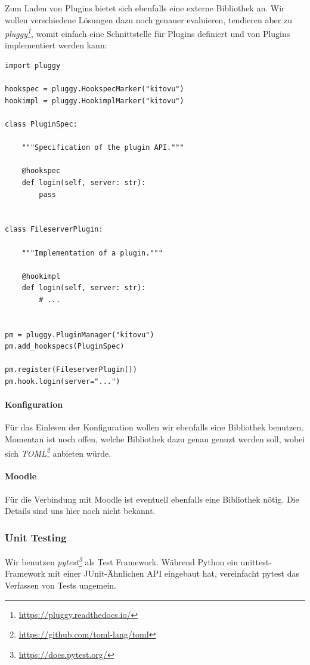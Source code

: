 \documentclass[a4paper]{article}
\newcommand{\tool}[2]{\emph{#1\footnote{\url{#2}}}}
\begin{document}
Zum Laden von Plugins bietet sich ebenfalls eine externe Bibliothek an. Wir
wollen verschiedene Lösungen dazu noch genauer evaluieren, tendieren aber zu
\tool{pluggy}{https://pluggy.readthedocs.io/}, womit einfach eine Schnittstelle
für Plugins definiert und von Plugins implementiert werden kann:

\begin{verbatim}
import pluggy

hookspec = pluggy.HookspecMarker("kitovu")
hookimpl = pluggy.HookimplMarker("kitovu")

class PluginSpec:

    """Specification of the plugin API."""

    @hookspec
    def login(self, server: str):
        pass


class FileserverPlugin:

    """Implementation of a plugin."""

    @hookimpl
    def login(self, server: str):
        # ...


pm = pluggy.PluginManager("kitovu")
pm.add_hookspecs(PluginSpec)

pm.register(FileserverPlugin())
pm.hook.login(server="...")
\end{verbatim}

\paragraph{Konfiguration}

Für das Einlesen der Konfiguration wollen wir ebenfalls eine Bibliothek
benutzen. Momentan ist noch offen, welche Bibliothek dazu genau genuzt werden
soll, wobei sich \tool{TOML}{https://github.com/toml-lang/toml} anbieten würde.

\paragraph{Moodle}

Für die Verbindung mit Moodle ist eventuell ebenfalls eine Bibliothek nötig.
Die Details sind uns hier noch nicht bekannt.

\subsubsection{Unit Testing}

Wir benutzen \tool{pytest}{https://docs.pytest.org/} als Test
Framework. Während Python ein unittest-Framework mit einer JUnit-Ähnlichen API
eingebaut hat, vereinfacht pytest das Verfassen von Tests ungemein.
\end{document}
